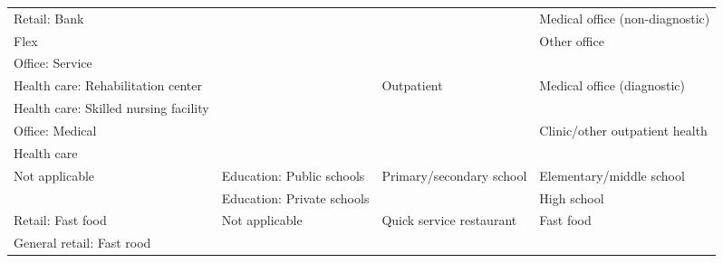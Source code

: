 \begin{table}
\begin{tabular}{|p{4.25cm}|p{3.5cm}|p{3.25cm}|p{4.25cm}|}
Retail: Bank                                          &                                                 &                                           & Medical office (non-diagnostic)                 \\ \cline{1-1} \cline{4-4} 
Flex                                                  &                                                 &                                           & \multirow{2}{*}{Other office}                   \\ \cline{1-1}
Office: Service                                       &                                                 &                                           &                                                 \\ \cline{1-1} \cline{3-4} 
Health care: Rehabilitation   center                  &                                                 & \multirow{4}{*}{Outpatient}               & \multirow{2}{*}{Medical office (diagnostic)}    \\ \cline{1-1}
Health care: Skilled nursing   facility               &                                                 &                                           &                                                 \\ \cline{1-1} \cline{4-4} 
Office: Medical                                       &                                                 &                                           & \multirow{2}{*}{Clinic/other outpatient health} \\ \cline{1-1}
Health care                                           &                                                 &                                           &                                                 \\ \hline
\multicolumn{1}{|l|}{\multirow{2}{*}{Not applicable}} & \multicolumn{1}{l|}{Education: Public schools}  & \multirow{2}{*}{Primary/secondary school} & Elementary/middle school                        \\ \cline{2-2} \cline{4-4} 
\multicolumn{1}{|c|}{}                                & \multicolumn{1}{l|}{Education: Private schools} &                                           & High school                                     \\ \hline
Retail: Fast food                                     & \multirow{24}{*}{Not applicable}                & \multirow{2}{*}{Quick service restaurant} & \multirow{2}{*}{Fast food}                      \\ \cline{1-1}
General retail: Fast rood                             &                                                 &                                           &                                                 \\ \cline{1-1} \cline{3-4} 

\end{tabular}
\end{table}
